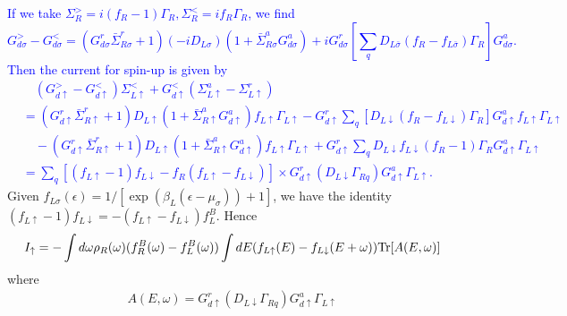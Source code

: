 \documentclass[aps,prb,superscriptaddress]{revtex4-2}
\begin{document}
\textcolor{blue}{
If we take $\Sigma_R^{>}=i(f_R-1)\Gamma_R, \Sigma_R^{<}=if_R\Gamma_R$, we find
\begin{equation}
G^>_{d\sigma} - G^<_{d\sigma} = (G^r_{d\sigma}{\bar \Sigma}_{R\sigma}^r+1) (-iD_{L\sigma}) (1+{\bar \Sigma}_{R\sigma}^a
G^a_{d\sigma}) + i G^r_{d\sigma}[ \sum_q D_{L\bar\sigma}(f_{R}-f_{L\bar\sigma})\Gamma_R ] G^a_{d\sigma}.
\end{equation}
Then the current for spin-up is given by
\begin{equation}
\begin{split}
&\quad(G_{d\uparrow}^>-G_{d\uparrow}^< )\Sigma_{L\uparrow}^< +G_{d\uparrow}^< (\Sigma_{L\uparrow}^a-\Sigma_{L\uparrow}^r) \\
&= (G^r_{d\uparrow}{\bar \Sigma}_{R\uparrow}^r+1) D_{L\uparrow} (1+{\bar \Sigma}_{R\uparrow}^a G^a_{d\uparrow})f_{L\uparrow}\Gamma_{L\uparrow} - G^r_{d\uparrow} \sum_q [D_{L\downarrow}(f_{R}-f_{L\downarrow})\Gamma_{R}] G^a_{d\uparrow} f_{L\uparrow}\Gamma_{L\uparrow} \\
&\quad - (G^r_{d\uparrow}{\bar \Sigma}_{R\uparrow}^r+1) D_{L\uparrow} (1+{\bar \Sigma}_{R\uparrow}^a G^a_{d\uparrow}) f_{L\uparrow}\Gamma_{L\uparrow} + G^r_{d\uparrow} \sum_q D_{L\downarrow}f_{L\downarrow}(f_R-1)\Gamma_R G^a_{d\uparrow} \Gamma_{L\uparrow} \\
& =\sum_q [(f_{L\uparrow}-1)f_{L\downarrow} - f_R(f_{L\uparrow}-f_{L\downarrow})] \times G^r_{d\uparrow} (D_{L\downarrow} \Gamma_{Rq}) G^a_{d\uparrow}\Gamma_{L\uparrow}.
\end{split}
\end{equation}}
Given $f_{L\sigma}(\epsilon) = 1/[\exp(\beta_L (\epsilon-\mu_\sigma))+1]$, we have the identity $(f_{L\uparrow}-1)f_{L\downarrow}= -(f_{L\uparrow}-f_{L\downarrow})f^B_L$. Hence
\begin{eqnarray}\label{eq:Iup}
I_\uparrow = -\int d\omega \rho_R(\omega) (f^B_R(\omega)-f^B_L(\omega))\int dE (f_{L\uparrow}(E)-f_{L\downarrow}(E+\omega)) {\rm Tr}[A(E,\omega)] \label{spin5}
\end{eqnarray}
where
\begin{eqnarray}
A(E,\omega)=G^r_{d\uparrow} (D_{L\downarrow} \Gamma_{Rq}) G^a_{d\uparrow}\Gamma_{L\uparrow} \nonumber
\end{eqnarray}
\end{document}
